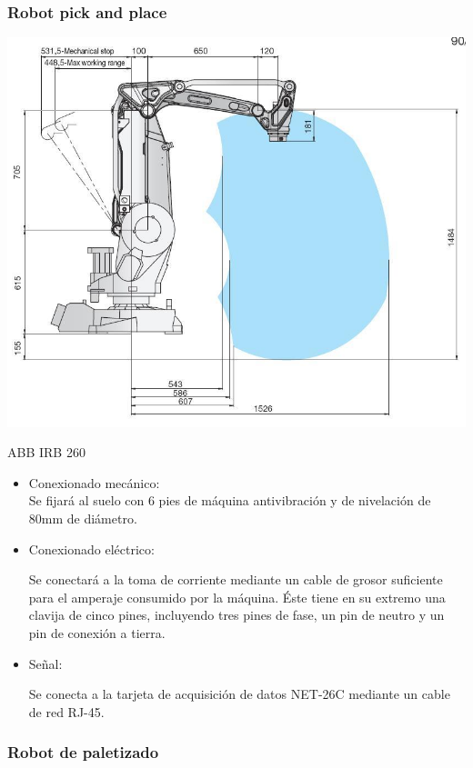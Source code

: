 \newpage

\subsubsection{Robot pick and place}

	\includegraphics[scale=0.3]{Datasheets/8Foto.jpg}
	
	ABB IRB 260
		\begin{itemize}
				\item{Conexionado mecánico:}\\
				
				Se fijará al suelo con 6 pies de máquina antivibración y de nivelación de 80mm de diámetro.

				\item{Conexionado eléctrico:}

				Se conectará a la toma de corriente mediante un cable de grosor suficiente para el amperaje consumido por la máquina. Éste tiene en su extremo una clavija de cinco pines, incluyendo tres pines de fase, un pin de neutro y un pin de conexión a tierra.  
				
				\item{Señal:}

				Se conecta a la tarjeta de acquisición de datos NET-26C mediante un cable de red RJ-45.
		\end{itemize}




\newpage

	\subsubsection{Robot de paletizado}

